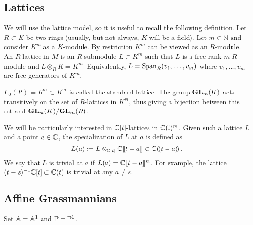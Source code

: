 \documentclass[draft]{article}
\begin{document}

\subsection{Lattices}
\label{ss:lat}
We will use the lattice model, so it is useful to recall the following definition.  Let $ R \subset K$ be two rings (usually, but not always, $K$ will be a field).  Let $ m \in \mathbb N$ and consider $ K^m $ as a $K$-module.   By restriction $ K^m$ can be viewed as an $R$-module.  An $R$-lattice in $M$ is an $R$-submodule $ L \subset K^m$ such that $ L $ is a free rank $ m $ $R$-module and $ L \otimes_R K = K^m $.  Equivalently, $ L = \Sp_R(v_1, \dots, v_m)$ where $v_1, \dots, v_m$ are free generators of $K^m$. 

$L_0(R) = R^m \subset K^m $ is called the standard lattice. The group $\GL_m(K) $ acts transitively on the set of $R$-lattices in $K^m$, thus giving a bijection between 
this set and $\GL_m(K)/\GL_m(R)$.

We will be particularly interested in $\CC[t]$-lattices in $ \CC(t)^m$.  Given such a lattice $ L $ and a point $ a \in \CC$, the specialization of $ L $ at $ a $ is defined as
$$
L(a) := L \otimes_{\CC[t]} \CC\xt[t-a] \subset \CC\xT[t-a]\,.
$$
We say that $ L $ is trivial at $ a $ if $ L(a) = \CC\xt[t-a]^m$. For example, the lattice $(t-s)^{-1}\CC[t] \subset \CC(t)$ is trivial at any $a\ne s$. 






\subsection{Affine Grassmannians} %

Set $\AA = \AA^1$ and $\PP = \PP^1$. 
\end{document}
